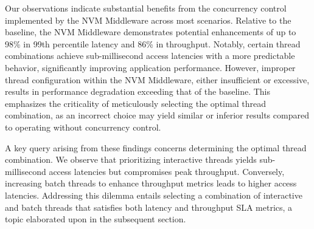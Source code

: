 Our observations indicate substantial benefits from the concurrency control implemented by the NVM Middleware across most scenarios. Relative to the baseline, the NVM Middleware demonstrates potential enhancements of up to 98\% in 99th percentile latency and 86\% in throughput. Notably, certain thread combinations achieve sub-millisecond access latencies with a more predictable behavior, significantly improving application performance. However, improper thread configuration within the NVM Middleware, either insufficient or excessive, results in performance degradation exceeding that of the baseline. This emphasizes the criticality of meticulously selecting the optimal thread combination, as an incorrect choice may yield similar or inferior results compared to operating without concurrency control.

A key query arising from these findings concerns determining the optimal thread combination. We observe that prioritizing interactive threads yields sub-millisecond access latencies but compromises peak throughput. Conversely, increasing batch threads to enhance throughput metrics leads to higher access latencies. Addressing this dilemma entails selecting a combination of interactive and batch threads that satisfies both latency and throughput SLA metrics, a topic elaborated upon in the subsequent section.



